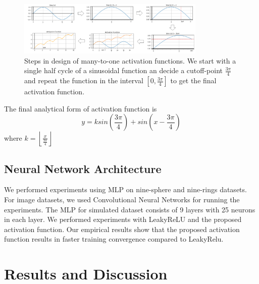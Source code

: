\documentclass[wcp]{jmlr}
\begin{document}
\begin{figure}[htp]
\begin{center}
\includegraphics[width=0.8\textwidth]{images/activation_function_design.png}
\caption{Steps in design of many-to-one activation functions. We start with a single half cycle of a sinusoidal function an decide a cutoff-point $\frac{3\pi}{4}$ and repeat the function in the interval $[0,\frac{3\pi}{4}]$ to get the final activation function.}
\label{fig:activation_function_design}
\end{center}
\end{figure}

The final analytical form of activation function is
\begin{equation}
y = ksin(\frac{3\pi}{4})   + sin(x - \frac{3\pi}{4})
\end{equation}
 where $k=\left \lfloor{\frac{x}{\frac{3\pi}{4}}}\right \rfloor$

\subsection{Neural Network Architecture}
We performed experiments using MLP  on nine-sphere and nine-rings datasets. For image datasets, we used Convolutional Neural Networks for running the experiments. The MLP for simulated dataset consists of 9 layers with 25 neurons in each layer. We performed experiments with LeakyReLU and the proposed activation function. Our empirical results show that the proposed activation function results in faster training convergence compared to LeakyRelu.

\section{Results and Discussion}
\end{document}
